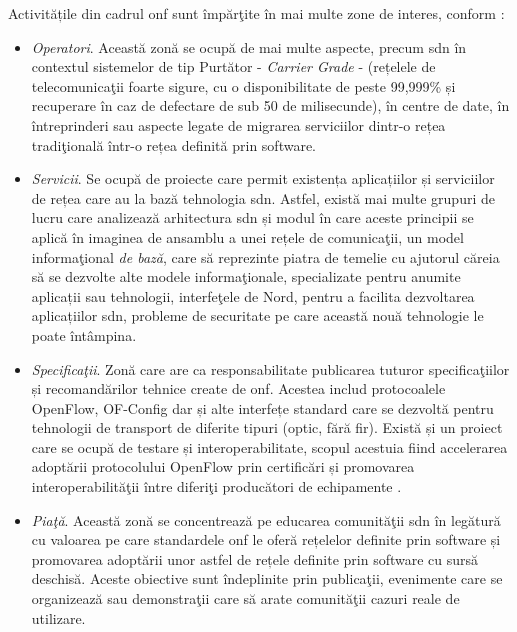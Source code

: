 Activitățile din cadrul \gls{onf} sunt împărţite în mai multe zone de interes, conform \cite{onftech}:
\begin{itemize}
	\item \textit{Operatori}. Această zonă se ocupă de mai multe aspecte, precum \gls{sdn} în contextul sistemelor de tip Purtător - \textit{Carrier Grade} - (rețelele de telecomunicaţii foarte sigure, cu o disponibilitate de peste 99,999\% și recuperare în caz de defectare de sub 50 de milisecunde), în centre de date, în întreprinderi sau aspecte legate de migrarea serviciilor dintr-o rețea tradiţională într-o rețea definită prin software.
	\item \textit{Servicii}. Se ocupă de proiecte care permit existența aplicațiilor și serviciilor de rețea care au la bază tehnologia \gls{sdn}. Astfel, există mai multe grupuri de lucru care analizează arhitectura \gls{sdn} și modul în care aceste principii se aplică în imaginea de ansamblu a unei rețele de comunicaţii, un model informaţional \textit{de bază}, care să reprezinte piatra de temelie cu ajutorul căreia să se dezvolte alte modele informaţionale, specializate pentru anumite aplicații sau tehnologii, interfeţele de Nord, pentru a facilita dezvoltarea aplicațiilor \gls{sdn}, probleme de securitate pe care această nouă tehnologie le poate întâmpina.  
	\item \textit{Specificaţii}. Zonă care are ca responsabilitate publicarea tuturor specificaţiilor și recomandărilor tehnice create de \gls{onf}. Acestea includ protocoalele OpenFlow, OF-Config dar și alte interfețe standard care se dezvoltă pentru tehnologii de transport de diferite tipuri (optic, fără fir). Există și un proiect care se ocupă de testare și interoperabilitate, scopul acestuia fiind accelerarea adoptării protocolului OpenFlow prin certificări și promovarea interoperabilităţii între diferiţi producători de echipamente \cite{onftr539}.
	\item \textit{Piaţă}. Această zonă se concentrează pe educarea comunităţii \gls{sdn} în legătură cu valoarea pe care standardele \gls{onf} le oferă rețelelor definite prin software și promovarea adoptării unor astfel de rețele definite prin software cu sursă deschisă. Aceste obiective sunt îndeplinite prin publicaţii, evenimente care se organizează sau demonstraţii care să arate comunităţii cazuri reale de utilizare.
\end{itemize}

